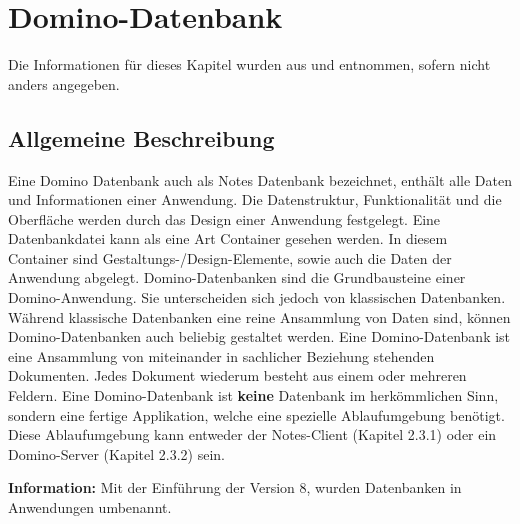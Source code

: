 \chapter{Domino-Datenbank}

Die Informationen für dieses Kapitel wurden aus\cite{ebel} und \cite{knaepper} entnommen, sofern nicht anders angegeben.

\section{Allgemeine Beschreibung}
\label{sec:3dominoDB}

Eine Domino Datenbank auch als Notes Datenbank bezeichnet, enthält alle Daten und Informationen einer Anwendung. 
Die Datenstruktur, Funktionalität und die Oberfläche werden durch das Design einer Anwendung festgelegt. Eine Datenbankdatei
kann als eine Art Container gesehen werden. In diesem Container sind Gestaltungs-/Design-Elemente, sowie auch die Daten der Anwendung abgelegt\cite{ebel}.
Domino-Datenbanken sind die Grundbausteine einer Domino-Anwendung. Sie unterscheiden sich jedoch von klassischen Datenbanken.
Während klassische Datenbanken eine reine Ansammlung von Daten sind, können Domino-Datenbanken auch beliebig gestaltet werden. 
Eine Domino-Datenbank ist eine Ansammlung von miteinander in sachlicher Beziehung stehenden Dokumenten. Jedes Dokument wiederum besteht  
aus einem oder mehreren Feldern\cite{knaepper}. \newline
%
Eine Domino-Datenbank ist \textbf{keine} Datenbank im herk\"ommlichen Sinn, sondern eine fertige Applikation, welche eine spezielle
Ablaufumgebung ben\"otigt. Diese Ablaufumgebung kann entweder der Notes-Client (Kapitel 2.3.1) oder ein Domino-Server (Kapitel 2.3.2) sein\cite{knaepper}.
\vspace{1cm}
\begin{graybox}
\textbf{Information: }Mit der Einführung der Version 8, wurden Datenbanken in Anwendungen umbenannt.
\end{graybox}

